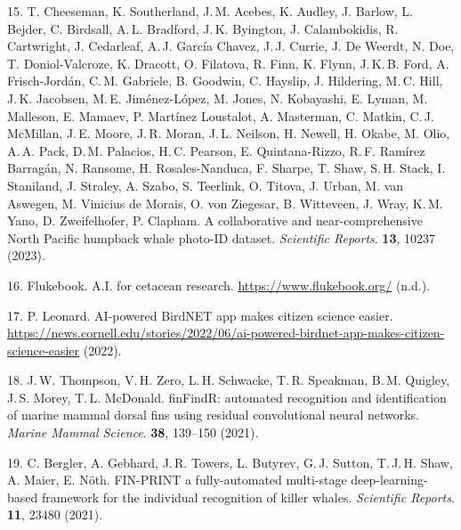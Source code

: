 \documentclass[twocolumn]{article}
\begin{document}
15. T. Cheeseman, K. Southerland, J.\,M. Acebes, K. Audley, J. Barlow, L. Bejder, C. Birdsall, A.\,L. Bradford, J.\,K. Byington, J. Calambokidis, R. Cartwright, J. Cedarleaf, A.\,J. García Chavez, J.\,J. Currie, J. De Weerdt, N. Doe, T. Doniol-Valcroze, K. Dracott, O. Filatova, R. Finn, K. Flynn, J.\,K.\,B. Ford, A. Frisch-Jordán, C.\,M. Gabriele, B. Goodwin, C. Hayslip, J. Hildering, M.\,C. Hill, J.\,K. Jacobsen, M.\,E. Jiménez-López, M. Jones, N. Kobayashi, E. Lyman, M. Malleson, E. Mamaev, P. Martínez Loustalot, A. Masterman, C. Matkin, C.\,J. McMillan, J.\,E. Moore, J.\,R. Moran, J.\,L. Neilson, H. Newell, H. Okabe, M. Olio, A.\,A. Pack, D.\,M. Palacios, H.\,C. Pearson, E. Quintana-Rizzo, R.\,F. Ramírez Barragán, N. Ransome, H. Rosales-Nanduca, F. Sharpe, T. Shaw, S.\,H. Stack, I. Staniland, J. Straley, A. Szabo, S. Teerlink, O. Titova, J. Urban, M. van Aswegen, M. Vinicius de Morais, O. von Ziegesar, B. Witteveen, J. Wray, K.\,M. Yano, D. Zweifelhofer, P. Clapham. A collaborative and near-comprehensive North Pacific humpback whale photo-ID dataset. \textit{Scientific Reports}. \textbf{13}, 10237 (2023).

16. Flukebook. A.I. for cetacean research. \url{https://www.flukebook.org/} (n.d.).

17. P. Leonard. AI-powered BirdNET app makes citizen science easier. \url{https://news.cornell.edu/stories/2022/06/ai-powered-birdnet-app-makes-citizen-science-easier} (2022).

18. J.\,W. Thompson, V.\,H. Zero, L.\,H. Schwacke, T.\,R. Speakman, B.\,M. Quigley, J.\,S. Morey, T.\,L. McDonald. finFindR: automated recognition and identification of marine mammal dorsal fins using residual convolutional neural networks. \textit{Marine Mammal Science}. \textbf{38}, 139–150 (2021).

19. C. Bergler, A. Gebhard, J.\,R. Towers, L. Butyrev, G.\,J. Sutton, T.\,J.\,H. Shaw, A. Maier, E. Nöth. FIN-PRINT a fully-automated multi-stage deep-learning-based framework for the individual recognition of killer whales. \textit{Scientific Reports}. \textbf{11}, 23480 (2021).
\end{document}
